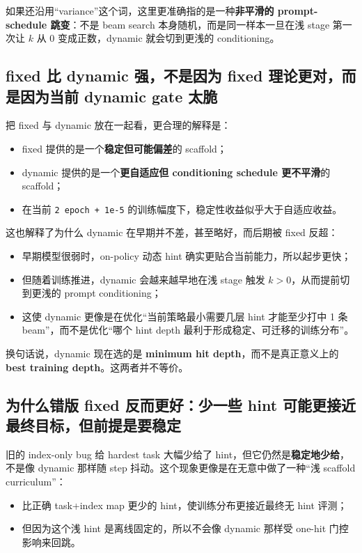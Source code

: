 \documentclass[a4paper]{article}
\begin{document}
如果还沿用“variance”这个词，这里更准确指的是一种\textbf{非平滑的 prompt-schedule 跳变}：不是 beam search 本身随机，而是同一样本一旦在浅 stage 第一次让 $k$ 从 0 变成正数，dynamic 就会切到更浅的 conditioning。

\subsection{fixed 比 dynamic 强，不是因为 fixed 理论更对，而是因为当前 dynamic gate 太脆}

把 fixed 与 dynamic 放在一起看，更合理的解释是：
\begin{itemize}
\item fixed 提供的是一个\textbf{稳定但可能偏差}的 scaffold；
\item dynamic 提供的是一个\textbf{更自适应但 conditioning schedule 更不平滑}的 scaffold；
\item 在当前 \texttt{2 epoch + 1e-5} 的训练幅度下，稳定性收益似乎大于自适应收益。
\end{itemize}

这也解释了为什么 dynamic 在早期并不差，甚至略好，而后期被 fixed 反超：
\begin{itemize}
\item 早期模型很弱时，on-policy 动态 hint 确实更贴合当前能力，所以起步更快；
\item 但随着训练推进，dynamic 会越来越早地在浅 stage 触发 $k>0$，从而提前切到更浅的 prompt conditioning；
\item 这使 dynamic 更像是在优化“当前策略最小需要几层 hint 才能至少打中 1 条 beam”，而不是优化“哪个 hint depth 最利于形成稳定、可迁移的训练分布”。
\end{itemize}

换句话说，dynamic 现在选的是 \textbf{minimum hit depth}，而不是真正意义上的 \textbf{best training depth}。这两者并不等价。

\subsection{为什么错版 fixed 反而更好：少一些 hint 可能更接近最终目标，但前提是要稳定}

旧的 index-only bug 给 hardest task 大幅少给了 hint，但它仍然是\textbf{稳定地少给}，不是像 dynamic 那样随 step 抖动。这个现象更像是在无意中做了一种“浅 scaffold curriculum”：
\begin{itemize}
\item 比正确 task+index map 更少的 hint，使训练分布更接近最终无 hint 评测；
\item 但因为这个浅 hint 是离线固定的，所以不会像 dynamic 那样受 one-hit 门控影响来回跳。
\end{itemize}
\end{document}
